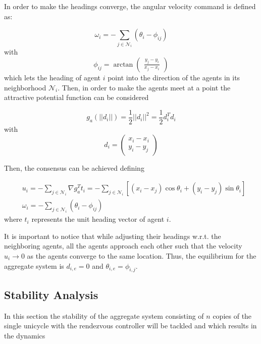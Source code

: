\documentclass[11pt]{article}
\begin{document}
In order to make the headings converge, the angular velocity command is defined as:

\begin{equation}
\omega_i = -\sum_{j \in \mathcal{N}_i} (\theta_i - \phi_{ij})
\end{equation}
with
\begin{equation}
\phi_{ij} = \arctan\begin{pmatrix}
\frac{y_j-y_i}{x_j-x_i}
\end{pmatrix}
\end{equation}
which lets the heading of agent $i$ point into the direction of the agents in its neighborhood $\mathcal{N}_i$. Then, in order to make the agents meet at a point the attractive potential function can be considered

\begin{equation}
g_a(||d_i||) = \frac{1}{2}||d_i||^2 = \frac{1}{2}d_i^Td_i
\end{equation}
with
\begin{equation}
d_i = \begin{pmatrix}
x_i - x_i\\
y_i - y_j
\end{pmatrix}
\end{equation}

Then, the consensus can be achieved defining

\begin{align}
& u_i = -\sum_{j \in \mathcal{N}_i} \nabla g_a^Tt_i = -\sum_{j \in \mathcal{N}_i} [(x_i - x_j)\cos\theta_i + (y_i - y_j)\sin\theta_i]\\
& \omega_i = -\sum_{j \in \mathcal{N}_i} (\theta_i - \phi_{ij})
\end{align}
where $t_i$ represents the unit heading vector of agent $i$.

It is important to notice that while adjusting their headings w.r.t. the neighboring agents, all the agents approach each other such that the velocity $u_i \rightarrow 0$ as the agents converge to the same location. Thus, the equilibrium for the aggregate system is $d_{i,e} = 0$ and $\theta_{i,e} = \phi_{i,j}$. 

\subsection*{Stability Analysis}

In this section the stability of the aggregate system consisting of $n$ copies of the single unicycle with the rendezvous controller will be tackled and which results in the dynamics
\end{document}
